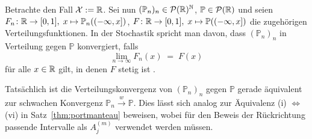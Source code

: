 \documentclass[../main/main.tex]{subfiles}
\begin{document}
	\begin{Bemerkung}[Verteilungskonvergenz]
		Betrachte den Fall $\mathcal{X} := \mathbb{R}$. Sei nun $(\mathbb{P}_n)_n \in \mathcal{P}(\mathbb{R})^{\mathbb{N}}$,  $\mathbb{P} \in \mathcal{P}(\mathbb{R})$ und seien $F_n \colon \mathbb{R} \to [0, 1], \; x \mapsto \mathbb{P}_n((-\infty, x]) $, $F \colon \mathbb{R} \to [0, 1], \; x \mapsto \mathbb{P}((-\infty, x]) $ die zugehörigen Verteilungsfunktionen. In der Stochastik spricht man davon, dass $(\mathbb{P}_n)_n$ in Verteilung gegen $\mathbb{P}$ konvergiert, falls 
		\[ \lim_{n \to \infty} F_n(x) \; = \; F(x) \]
		für alle $x \in \mathbb{R}$ gilt, in denen $F$ stetig ist \cite[Definition 6.1]{Henze.2016}. 
		
		Tatsächlich ist die Verteilungskonvergenz von $(\mathbb{P}_n)_n$ gegen $\mathbb{P}$ gerade äquivalent zur schwachen Konvergenz $\mathbb{P}_n \xrightarrow{w} \mathbb{P}$. Dies lässt sich analog zur Äquivalenz (i) $\Leftrightarrow$ (vi) in Satz~\ref{thm:portmanteau} beweisen, wobei für den Beweis der Rückrichtung passende Intervalle als $A_j^{(m)}$ verwendet werden müssen.
	\end{Bemerkung}
	
\end{document}
